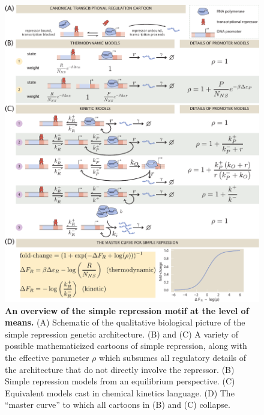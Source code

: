 \afterpage{\clearpage}
\begin{figure}[p]
\centering
\includegraphics[width=\textwidth]{../../figures/main/fig01.pdf}
\caption{\textbf{An overview of the simple repression motif at the level of
means.} (A) Schematic of the qualitative biological picture of the simple
repression genetic architecture. (B) and (C) A variety of possible
mathematicized cartoons of simple repression, along with the effective parameter
$\rho$ which subsumes all regulatory details of the architecture that do not
directly involve the repressor. (B) Simple repression models from an equilibrium
perspective. (C) Equivalent models cast in chemical kinetics language. (D) The
``master curve'' to which all cartoons in (B) and (C) collapse.}
\label{fig1:means_cartoons}
\end{figure}

